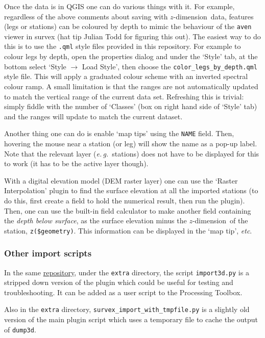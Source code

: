 \documentclass[]{article}
\newcommand{\zdimension}{$z$-dimension}
\newcommand{\latin}[1]{\emph{#1}}
\newcommand{\eg}{\latin{e.\,g.}}
\newcommand{\etc}{\latin{etc}}
\begin{document}
Once the data is in QGIS one can do various things with it.  For
example, regardless of the above comments about saving with
\zdimension\ data, features (legs or stations) can be coloured by
depth to mimic the behaviour of the \verb+aven+ viewer in survex (hat
tip Julian Todd for figuring this out).  The easiest way to do this is
to use the \verb+.qml+ style files provided in this repository.  For
example to colour legs by depth, open the properties dialog and under
the `Style' tab, at the bottom select `Style $\rightarrow$ Load
Style', then choose the \verb}color_legs_by_depth.qml} style
file. This will apply a graduated colour scheme with an inverted
spectral colour ramp.  A small limitation is that the ranges are not
automatically updated to match the vertical range of the current data
set.  Refreshing this is trivial: simply fiddle with the number of
`Classes' (box on right hand side of `Style' tab) and the ranges will
update to match the current dataset.

Another thing one can do is enable `map tips' using the \verb+NAME+ field.
Then, hovering the mouse near a station (or leg) will show the name as a
pop-up label.  Note that the relevant layer (\eg\ stations) does not
have to be displayed for this to work (it has to be the active layer
though).

With a digital elevation model (DEM raster layer) one can use the
`Raster Interpolation' plugin to find the surface elevation at all the
imported stations (to do this, first create a field to hold the
numerical result, then run the plugin).  Then, one can use the
built-in field calculator to make another field containing the \emph{depth
below surface}, as the surface elevation minus the \zdimension\ of the
station, \verb+z($geometry)+.  This information can be displayed in the
`map tip', \etc.

\subsubsection{Other import scripts}\label{other-import-scripts}

In the same
\href{https://github.com/patrickbwarren/qgis-survex-import}{repository},
under the \verb}extra} directory, the script \verb}import3d.py} is a
stripped down version of the plugin which could be useful for testing
and troubleshooting. It can be added as a user script to the
Processing Toolbox.

Also in the \verb}extra} directory,
\verb}survex_import_with_tmpfile.py} is a slightly old version of
the main plugin script which uses a temporary file to cache the output
of \verb}dump3d}.
\end{document}
